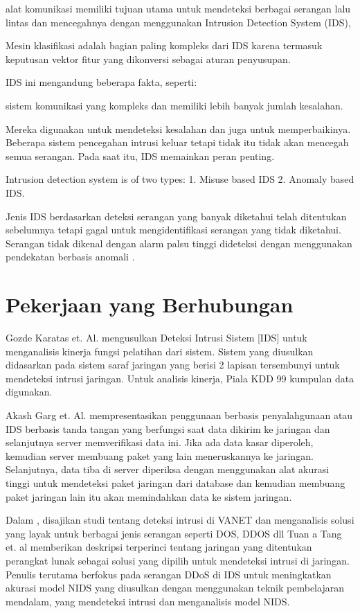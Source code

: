 \documentclass[conference]{IEEEtran}
\begin{document}
    alat komunikasi memiliki tujuan utama untuk mendeteksi berbagai serangan lalu lintas dan mencegahnya dengan menggunakan Intrusion Detection System (IDS),
    
    Mesin klasifikasi adalah bagian paling kompleks dari IDS karena termasuk keputusan vektor fitur yang dikonversi sebagai aturan penyusupan.
    
     IDS ini mengandung beberapa fakta, seperti:
     
     sistem komunikasi yang kompleks dan memiliki lebih banyak jumlah kesalahan.
     
     Mereka digunakan untuk mendeteksi kesalahan dan juga untuk memperbaikinya. Beberapa sistem pencegahan intrusi keluar tetapi tidak itu tidak akan mencegah semua serangan. Pada saat itu, IDS memainkan peran penting.
     
     Intrusion detection system is of two types: 1. Misuse based IDS 2. Anomaly based IDS.
     
     Jenis IDS berdasarkan deteksi serangan yang banyak diketahui telah ditentukan sebelumnya tetapi gagal untuk mengidentifikasi serangan yang tidak diketahui. Serangan tidak dikenal dengan alarm palsu tinggi dideteksi dengan menggunakan pendekatan berbasis anomali \cite{aydin2009hybrid}.
     
\section{Pekerjaan yang Berhubungan}
    Gozde Karatas et. Al.  \cite {karatas2018neural} mengusulkan Deteksi Intrusi Sistem [IDS] untuk menganalisis kinerja fungsi pelatihan dari sistem. Sistem yang diusulkan didasarkan pada sistem saraf jaringan yang berisi 2 lapisan tersembunyi untuk mendeteksi intrusi jaringan. Untuk analisis kinerja, Piala KDD 99 kumpulan data digunakan.
    
    Akash Garg et. Al. \cite {garg2016hybrid} mempresentasikan penggunaan berbasis penyalahgunaan atau IDS berbasis tanda tangan yang berfungsi saat data dikirim ke jaringan dan selanjutnya server memverifikasi data ini. Jika ada data kasar diperoleh, kemudian server membuang paket yang lain meneruskannya ke jaringan. Selanjutnya, data tiba di server diperiksa dengan menggunakan alat akurasi tinggi untuk mendeteksi paket jaringan dari database dan kemudian membuang paket jaringan lain itu akan memindahkan data ke sistem jaringan.
    
    Dalam \cite {gonccalves2019systematic}, disajikan studi tentang deteksi intrusi di VANET dan menganalisis solusi yang layak untuk berbagai jenis serangan seperti DOS, DDOS dll Tuan a Tang et. al \cite{tang2016deep} memberikan deskripsi terperinci tentang jaringan yang ditentukan perangkat lunak sebagai solusi yang dipilih untuk mendeteksi intrusi di jaringan. Penulis terutama berfokus pada serangan DDoS di IDS untuk meningkatkan akurasi model NIDS yang diusulkan dengan menggunakan teknik pembelajaran mendalam, yang mendeteksi intrusi dan menganalisis model NIDS.
\end{document}
